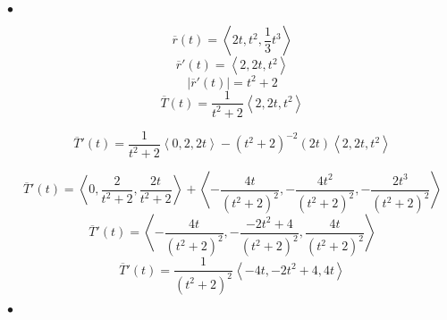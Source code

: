 \begin{definition}
\smallskip\hfill$\bullet$\end{definition}

\begin{example}[]
	\[\overline{r}(t) = \left<2t, t^2, \frac{1}{3}t^3 \right>\]
	\[\overline{r}'(t) = \left<2, 2t, t^2 \right>\]
	\[\left|  \overline{r}'(t) \right| = t^2 +2\]
	\[\overline{T}(t) = \frac{1}{t^2+2}\left<2,2t,t^2 \right>\]

	\[\overline{T}'(t) = \frac{1}{t^2+2} \left<0, 2, 2t \right> -(t^2+2)^{-2}(2t)\left<2, 2t, t^2 \right>\]

	\[\overline{T}'(t) = \left<0, \frac{2}{t^2+2}, \frac{2t}{t^2+2} \right> + \left< -\frac{4t}{(t^2+2)^2}, -\frac{4t^2}{(t^2+2)^2},-\frac{2t^3}{(t^2+2)^2}\right>\]
	\[\overline{T}'(t) =\left< -\frac{4t}{(t^2+2)^2}, -\frac{-2t^2+4}{(t^2+2)^2},\frac{4t}{(t^2+2)^2}\right>\]
	\[\overline{T}'(t) = \frac{1}{(t^2+2)^2}\left< -4t, -2t^2+4, 4t \right>\]

\smallskip\hfill$\bullet$\end{example}






\newpage


